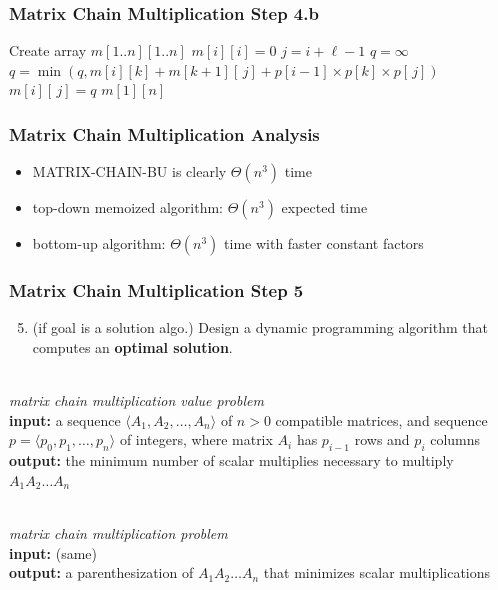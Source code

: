 \documentclass[10pt,aspectratio=169]{beamer}
\newcommand{\stanza}{ \\~\ }
\begin{document}
\begin{frame} \frametitle{Matrix Chain Multiplication Step 4.b}
  {\footnotesize
  \begin{algorithmic}[1]
    \State Create array $m[1..n][1..n]$
      \State $m[i][i] = 0$ 
    \EndFor
     
        \State $j = i + \ell - 1$
        \State $q=\infty$
          \State $q = \min(q, m[i][k] + m[k+1][\,j] + p[i-1] \times p[k] \times p[\,j])$
        \EndFor
        \State $m[i][\,j] = q$
      \EndFor
    \EndFor
    \State \Return $m[1][n]$
    \EndFunction
  \end{algorithmic}
  }
\end{frame}

\begin{frame} \frametitle{Matrix Chain Multiplication Analysis}
  \begin{itemize}
    \item MATRIX-CHAIN-BU is clearly $\Theta(n^3)$ time
    \item top-down memoized algorithm: $\Theta(n^3)$ expected time
    \item bottom-up algorithm: $\Theta(n^3)$ time with faster constant factors
  \end{itemize}
\end{frame}

\begin{frame} \frametitle{Matrix Chain Multiplication Step 5}
  \begin{enumerate}
    \setcounter{enumi}{4}
    \item (if goal is a solution algo.) Design a dynamic programming algorithm that computes an \textbf{optimal solution}.
    \stanza
  \end{enumerate}

  \emph{matrix chain multiplication value problem} \\
  \textbf{input:} a sequence $\langle A_1, A_2, \ldots, A_n \rangle$ of $n>0$ compatible matrices,
    and sequence $p=\langle p_0, p_1, \ldots, p_n \rangle$ of integers, where
    matrix $A_i$ has $p_{i-1}$ rows and $p_i$ columns \\
  \textbf{output:} the minimum number of scalar multiplies necessary to multiply $A_1 A_2 \ldots A_n$ 
  \stanza

  \emph{matrix chain multiplication problem} \\
  \textbf{input:} (same) \\
  \textbf{output:} a parenthesization of $A_1 A_2 \ldots A_n$ that minimizes scalar multiplications

\end{frame}
\end{document}
